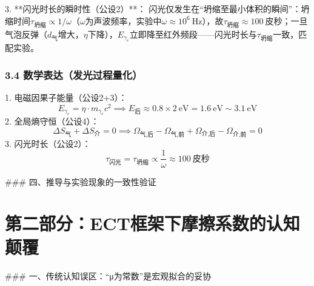 \documentclass{article}
\begin{document}
3. **闪光时长的瞬时性（公设2）**：  
   闪光仅发生在“坍缩至最小体积的瞬间”：坍缩时间$\tau_{\text{坍缩}} \propto 1/\omega$（$\omega$为声波频率，实验中$\omega \approx 10^6\ \text{Hz}$），故$\tau_{\text{坍缩}} \approx 100\ \text{皮秒}$；一旦气泡反弹（$d_{\text{气}}$增大，$\eta$下降），$E_{\gamma_e}$立即降至红外频段——闪光时长与$\tau_{\text{坍缩}}$一致，匹配实验。

\subsubsection{3.4 数学表达（发光过程量化）}
1. 电磁因果子能量（公设2+3）：  
   \[
   E_{\gamma_e} = \eta \cdot m_{\gamma_e} c^2 \implies E_{\text{后}} \approx 0.8 \times 2\ \text{eV} = 1.6\ \text{eV} \sim 3.1\ \text{eV}
   \]
2. 全局熵守恒（公设4）：  
   \[
   \Delta S_{\text{气}} + \Delta S_{\text{介}} = 0 \implies \Omega_{\text{气,后}} - \Omega_{\text{气,前}} + \Omega_{\text{介,后}} - \Omega_{\text{介,前}} = 0
   \]
3. 闪光时长（公设2）：  
   \[
   \tau_{\text{闪光}} = \tau_{\text{坍缩}} \propto \frac{1}{\omega} \approx 100\ \text{皮秒}
   \]


### 四、推导与实验现象的一致性验证
\begin{table}[h!]
\centering
{}
\end{table}


\section{第二部分：ECT框架下摩擦系数的认知颠覆}
### 一、传统认知误区：“μ为常数”是宏观拟合的妥协
\end{document}
